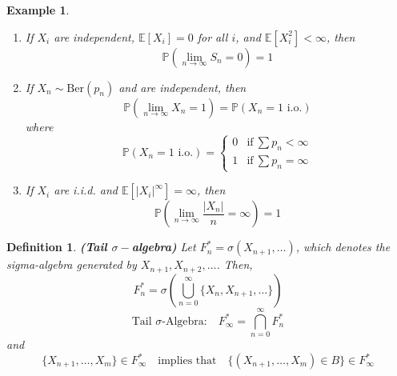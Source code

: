\documentclass{article}
\newcommand{\1}{\mathds{1}}
\newtheorem{definition}[theorem]{Definition}
\newtheorem{example}{Example}
\begin{document}
\begin{example}
    \begin{enumerate}
        \item If \( X_i \) are independent, \( \mathbb{E}[X_i] = 0 \) for all \( i \), and \( \mathbb{E}[X_i^2] < \infty \), then
\[
\mathbb{P} \left( \lim_{n \to \infty} S_n = 0 \right) = 1
\]
\item If \( X_n \sim \text{Ber}(p_n) \) and are independent, then
\[
\mathbb{P} \left( \lim_{n \to \infty} X_n = 1 \right) = \mathbb{P}(X_n = 1 \text{ i.o.})
\]
where
\[
\mathbb{P}(X_n = 1 \text{ i.o.}) = 
\begin{cases}
0 & \text{if} \ \sum p_n < \infty \\
1 & \text{if} \ \sum p_n = \infty
\end{cases}
\]
\item If \( X_i \) are i.i.d. and \( \mathbb{E}[|X_i|^\infty] = \infty \), then
\[
\mathbb{P} \left( \lim_{n \to \infty} \frac{|X_n|}{n} = \infty \right) = 1
\]
    \end{enumerate}
\end{example}
\begin{definition}\textbf{(Tail $\sigma-$algebra)}
    Let \( F_n^* = \sigma(X_{n+1}, \dots) \), which denotes the sigma-algebra generated by \( X_{n+1}, X_{n+2}, \dots \). Then,
\[
F_n^* = \sigma \left( \bigcup_{n=0}^\infty \{ X_n, X_{n+1}, \dots \} \right)
\]
\[
\text{Tail \(\sigma\)-Algebra:} \quad F_\infty^* = \bigcap_{n=0}^\infty F_n^*
\]
and
\[
\{ X_{n+1}, \dots, X_m \} \in F_\infty^* \quad \text{implies that} \quad \{ (X_{n+1}, \dots, X_m) \in B \} \in F_\infty^*
\]
\end{definition}
\end{document}
